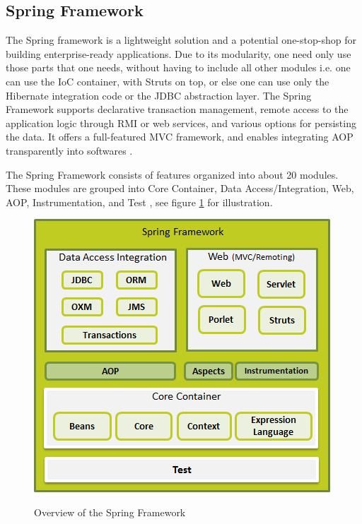 \subsection{Spring Framework\label{sec:back_sp_fr}}
The Spring framework is a lightweight solution and a potential one-stop-shop for building enterprise-ready applications. Due to its modularity, one need only use those parts that one needs, without having to include all other modules i.e. one can use the IoC container, with Struts on top, or else one can use only the Hibernate integration code or the \ac{JDBC} abstraction layer. The Spring Framework supports declarative transaction management, remote access to the application logic through \ac{RMI} or web services, and various options for persisting the data. It offers a full-featured \ac{MVC} framework, and enables integrating \ac{AOP} transparently into  softwares \cite{spring-framework-reference}.


The Spring Framework consists of features organized into about 20 modules. These modules are grouped into Core Container, Data Access/Integration, Web, \ac{AOP}, Instrumentation, and Test \cite{spring-framework-reference}, see figure \ref{fig:spring_arch} for illustration.

\begin{figure}[htb]
  \centering
  \includegraphics[scale=0.6]{spring_architecture.png}\\
  \caption{Overview of the Spring Framework}
  \label{fig:spring_arch}
  \protect\cite{spring-framework-reference}
\end{figure}